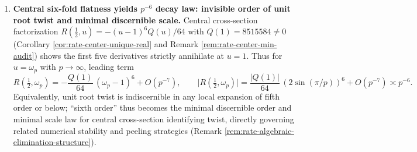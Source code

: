 \begin{enumerate}
  \item \textbf{Central six-fold flatness yields \texorpdfstring{$p^{-6}$}{p^-6} decay law: invisible order of unit root twist and minimal discernible scale.}
  Central cross-section factorization \(R(\tfrac12,u)=-(u-1)^6Q(u)/64\) with \(Q(1)=8515584\neq 0\) (Corollary \ref{cor:rate-center-unique-real} and Remark \ref{rem:rate-center-min-audit}) shows the first five derivatives strictly annihilate at \(u=1\).
  Thus for \(u=\omega_p\) with \(p\to\infty\), leading term
  \[
  R\!\left(\tfrac12,\omega_p\right)
  =-\frac{Q(1)}{64}\,(\omega_p-1)^6+O(p^{-7}),
  \qquad
  \bigl|R\!\left(\tfrac12,\omega_p\right)\bigr|
  =\frac{|Q(1)|}{64}\,(2\sin(\pi/p))^6+O(p^{-7})\asymp p^{-6}.
  \]
  Equivalently, unit root twist is indiscernible in any local expansion of fifth order or below; ``sixth order'' thus becomes the minimal discernible order and minimal scale law for central cross-section identifying twist, directly governing related numerical stability and peeling strategies (Remark \ref{rem:rate-algebraic-elimination-structure}).
\end{enumerate}

